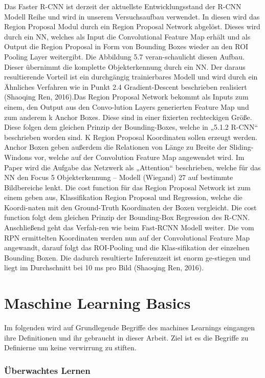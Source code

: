 \documentclass{llncs}
\begin{document}
Das Faster R-CNN ist derzeit der aktuellste Entwicklungsstand der R-CNN Modell Reihe und wird in unserem Versuchsaufbau verwendet. In diesen wird das Region Proposal Modul durch ein Region Proposal Network abgelöst. Dieses wird durch ein NN, welches als Input die Convolutional Feature Map erhält und als Output die Region Proposal in Form von Bounding Boxes wieder an den ROI Pooling Layer weitergibt. Die Abbildung 5.7 veran-schaulicht diesen Aufbau. Dieser übernimmt die komplette Objekterkennung durch ein NN. Der daraus resultierende Vorteil ist ein durchgängig trainierbares Modell und wird durch ein Ähnliches Verfahren wie in Punkt 2.4 Gradient-Descent beschrieben realisiert (Shaoqing Ren, 2016).Das Region Proposal Network bekommt als Inputs zum einem, den Output aus den Convo-lution Layers generierten Feature Map und zum anderem k Anchor Boxes. Diese sind in einer fixierten rechteckigen Größe. Diese folgen dem gleichen Prinzip der Bounding-Boxes, welche in „5.1.2 R-CNN“ beschrieben worden sind. K Region Proposal Koordinaten sollen erzeugt werden. Anchor Boxen geben außerdem die Relationen von Länge zu Breite der Sliding-Windons vor, welche auf der Convolution Feature Map angewendet wird. Im Paper wird die Aufgabe das Netzwerk als „Attention“ beschrieben, welche für das NN den Focus
5 Objekterkennung – Modell (Wiegand)
27
auf bestimmte Bildbereiche lenkt. Die cost function für das Region Proposal Network ist zum einem geben aus, Klassifikation Region Proposal und Regression, welche die Koordi-naten mit den Ground-Truth Koordinaten der Boxen vergleicht. Die cost function folgt dem gleichen Prinzip der Bounding-Box Regression des R-CNN. Anschließend geht das Verfah-ren wie beim Fast-RCNN Modell weiter. Die vom RPN ermittelten Koordinaten werden nun auf der Convolutional Feature Map angewandt, darauf folgt das ROI-Pooling und die Klas-sifikation der einzelnen Bounding Boxen. Die dadurch resultierte Inferenzzeit ist enorm ge-stiegen und liegt im Durchschnitt bei 10 ms pro Bild (Shaoqing Ren, 2016).

\section{Maschine Learning Basics}
Im folgenden wird auf Grundlegende Begriffe des machines Learnings eingangen ihre Definitionen und ihr gebraucht in dieser Arbeit. Ziel ist es die Begriffe zu Definierne um keine verwirrung zu stiften. 
\newpage
\subsubsection{Überwachtes Lernen}
\end{document}
